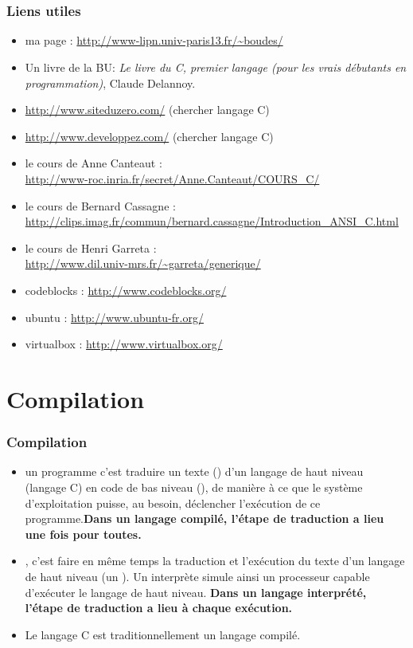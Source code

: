 \documentclass[xcolor=svgnames]{beamer}
\begin{document}
\section[Plan]{}
\frame[label=plan]{\tableofcontents}


\begin{frame}
  \frametitle{Liens utiles}

  \begin{itemize} 
\item ma page : \url{http://www-lipn.univ-paris13.fr/~boudes/}
\item Un livre de la BU: \emph{Le livre du C, premier langage (pour les
  vrais débutants en programmation)}, Claude Delannoy.
\item \url{http://www.siteduzero.com/} (chercher langage C)
\item \url{http://www.developpez.com/} (chercher langage C)
\item le cours de Anne Canteaut :\\ {\small\url{http://www-roc.inria.fr/secret/Anne.Canteaut/COURS_C/}}
\item le cours de Bernard Cassagne :\\ {\small\url{http://clips.imag.fr/commun/bernard.cassagne/Introduction_ANSI_C.html}}
\item le cours de Henri Garreta  : \\
{\small\url{http://www.dil.univ-mrs.fr/~garreta/generique/}}
\item codeblocks : \url{http://www.codeblocks.org/}
\item ubuntu : \url{http://www.ubuntu-fr.org/}
\item virtualbox : \url{http://www.virtualbox.org/}
  \end{itemize} 
\end{frame}
 

\section{Compilation}
\begin{frame}
  \frametitle{Compilation}
\begin{itemize} 
\item  {} un programme c'est traduire un texte () d'un langage de haut niveau (langage C) en code de bas
  niveau (), de manière à ce que le système
  d'exploitation puisse, au besoin, déclencher l'exécution de ce
  programme.\pause \textbf{Dans un langage compilé, l'étape de traduction a
    lieu une fois pour toutes.}\pause

\item {}, c'est faire en même temps la traduction et l'exécution du
texte d'un langage de haut niveau (un ). Un interprète simule ainsi un
processeur capable d'exécuter le langage de haut niveau. \pause
\textbf{Dans un
langage interprété, l'étape de traduction a lieu à chaque exécution.}\pause
\item Le langage C est traditionnellement un langage compilé.
\end{itemize}
\end{frame}
\end{document}
